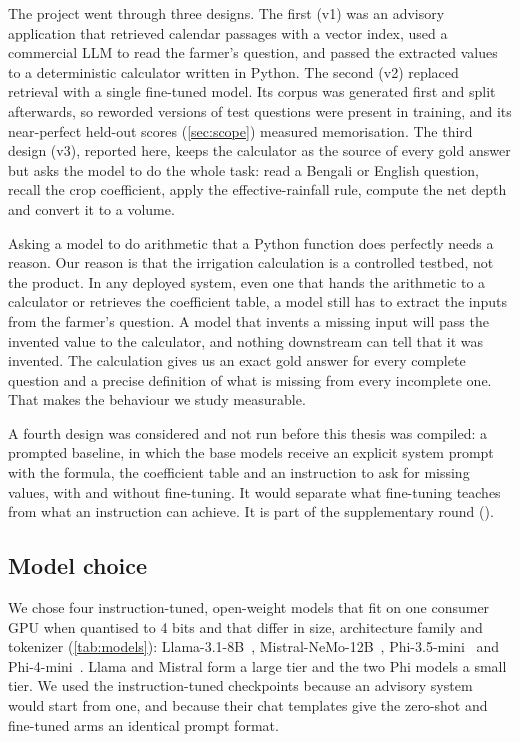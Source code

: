 The project went through three designs. The first (v1) was an advisory application that retrieved calendar passages with a vector index, used a commercial LLM to read the farmer's question, and passed the extracted values to a deterministic calculator written in Python. The second (v2) replaced retrieval with a single fine-tuned model. Its corpus was generated first and split afterwards, so reworded versions of test questions were present in training, and its near-perfect held-out scores (\cref{sec:scope}) measured memorisation. The third design (v3), reported here, keeps the calculator as the source of every gold answer but asks the model to do the whole task: read a Bengali or English question, recall the crop coefficient, apply the effective-rainfall rule, compute the net depth and convert it to a volume.

Asking a model to do arithmetic that a Python function does perfectly needs a reason. Our reason is that the irrigation calculation is a controlled testbed, not the product. In any deployed system, even one that hands the arithmetic to a calculator or retrieves the coefficient table, a model still has to extract the inputs from the farmer's question. A model that invents a missing input will pass the invented value to the calculator, and nothing downstream can tell that it was invented. The calculation gives us an exact gold answer for every complete question and a precise definition of what is missing from every incomplete one. That makes the behaviour we study measurable.

A fourth design was considered and not run before this thesis was compiled: a prompted baseline, in which the base models receive an explicit system prompt with the formula, the coefficient table and an instruction to ask for missing values, with and without fine-tuning. It would separate what fine-tuning teaches from what an instruction can achieve. It is part of the supplementary round ().

\subsection{Model choice}
\label{sec:model-choice}

We chose four instruction-tuned, open-weight models that fit on one consumer GPU when quantised to 4 bits and that differ in size, architecture family and tokenizer (\cref{tab:models}): Llama-3.1-8B~\cite{grattafiori2024llama}, Mistral-NeMo-12B~\cite{mistral2024nemo}, Phi-3.5-mini~\cite{abdin2024phi3} and Phi-4-mini~\cite{microsoft2025phi4mini}. Llama and Mistral form a large tier and the two Phi models a small tier. We used the instruction-tuned checkpoints because an advisory system would start from one, and because their chat templates give the zero-shot and fine-tuned arms an identical prompt format.

